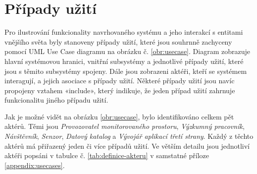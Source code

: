 \section{Případy užití}\label{kap:usecase}

Pro ilustrování funkcionality navrhovaného systému a jeho interakcí s entitami vnějšího světa byly stanoveny případy užití, které jsou souhrnně zachyceny pomocí UML Use Case diagramu na obrázku č. \ref{obr:usecase}. Diagram zobrazuje hlavní systémovou hranici, vnitřní subsystémy a jednotlivé případy užití, které jsou s těmito subsystémy spojeny. Dále jsou zobrazeni aktéři, kteří se systémem interagují, a jejich asociace s případy užití. Některé případy užití jsou navíc propojeny vztahem «include», který indikuje, že jeden případ užití zahrnuje funkcionalitu jiného případu užití. 

Jak je možné vidět na obrázku \ref{obr:usecase}, bylo identifikováno celkem pět aktérů. Těmi jsou \textit{Provozovatel monitorovaného prostoru}, \textit{Výzkumný pracovník}, \textit{Návštěvník}, \textit{Senzor}, \textit{Datový katalog} a \textit{Vývojář aplikací třetí strany}. Každý z těchto aktérů má přiřazený jeden či více případů užití. Ve větším detailu jsou jednotliví aktéři popsáni v tabulce č. \ref{tab:definice-akteru} v samstatné příloze \ref{appendix:usecases}. 

